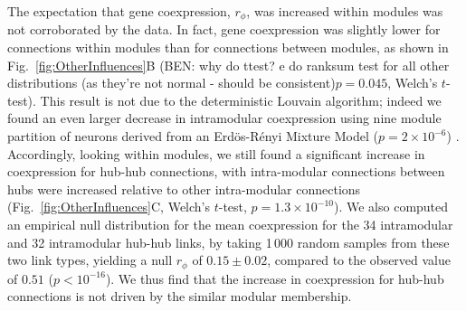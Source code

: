 \documentclass[10pt,letterpaper]{article}
\begin{document}
The expectation that gene coexpression, $r_\phi$, was increased within modules was not corroborated by the data.
In fact, gene coexpression was slightly lower for connections within modules than for connections between modules, as shown in Fig.~\ref{fig:OtherInfluences}B (BEN: why do ttest? e do ranksum test for all other distributions (as they're not normal - should be consistent)$p = 0.045$, Welch's $t$-test).
This result is not due to the deterministic Louvain algorithm; indeed we found an even larger decrease in intramodular coexpression using nine module partition of neurons derived from an Erd\"os-R\'enyi Mixture Model ($p = 2\times10^{-6}$) \cite{Pavlovic2014}.
Accordingly, looking within modules, we still found a significant increase in coexpression for hub-hub connections, with intra-modular connections between hubs were increased relative to other intra-modular connections (Fig.~\ref{fig:OtherInfluences}C, Welch's $t$-test, $p = 1.3\times 10^{-10}$).
We also computed an empirical null distribution for the mean coexpression for the 34 intramodular and 32 intramodular hub-hub links, by taking 1\,000 random samples from these two link types, yielding a null $r_\phi$ of $0.15 \pm 0.02$, compared to the observed value of $0.51$ ($p < 10^{-16}$).
We thus find that the increase in coexpression for hub-hub connections is not driven by the similar modular membership.

\end{document}

